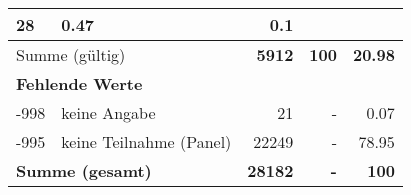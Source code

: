 \begin{longtable}{lXrrr}
       \num{28} &
       \num[round-mode=places,round-precision=2]{0,47} &
         \num[round-mode=places,round-precision=2]{0,1} \\
     \midrule
     \multicolumn{2}{l}{Summe (gültig)} &
       \textbf{\num{5912}} &
     \textbf{100} &
       \textbf{\num[round-mode=places,round-precision=2]{20,98}} \\
     \multicolumn{5}{l}{\textbf{Fehlende Werte}}\\
       -998 &
       keine Angabe &
         \num{21} &
        - &
         \num[round-mode=places,round-precision=2]{0,07} \\
       -995 &
       keine Teilnahme (Panel) &
         \num{22249} &
        - &
         \num[round-mode=places,round-precision=2]{78,95} \\
     \midrule
     \multicolumn{2}{l}{\textbf{Summe (gesamt)}} &
          \textbf{\num{28182}} &
        \textbf{-} &
        \textbf{100} \\
     \bottomrule
     \end{longtable}
     
